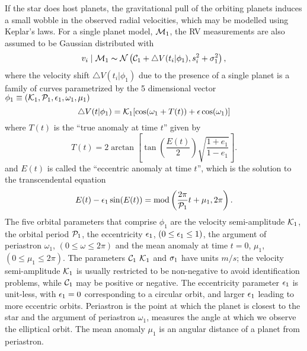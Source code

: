 If the star  does host planets, the gravitational pull of the orbiting
planets induces a small wobble in the observed radial velocities,
which may be modelled using Keplar's laws.
For a single planet model, $\M_1$, the RV measurements are also
assumed to be Gaussian distributed  with
\begin{equation}\label{Velocity_Model}
v_i \mid \M_1 \ind \N \left(\C_1 +\bigtriangleup
V(t_i|\phi_1),\s_i^2+\sj_1^2\right),
\end{equation}
where the velocity shift $\bigtriangleup
V(t_i|\phi_1)$ due to the presence of a single planet is
a  family of curves parametrized by the 5 dimensional vector
$\phi_1 \equiv (\K_1,\P_1,\e_1,\omega_1,\mu_1)$
\begin{equation}\label{Velocity_1p_Model}
\bigtriangleup V(t|\phi_1)=\K_1[\cos(\omega_1+T(t))+\e \cos(\omega_1)]
\end{equation}
where $T(t)$ is the ``true anomaly at time $t$'' given by
\begin{equation}\label{true_anomaly}
T(t)=2\arctan\left[\tan(\frac{E(t)}{2})\sqrt{\frac{1+e_1}{1-e_1}}\right].
\end{equation}
and $E(t)$ is called the ``eccentric anomaly at time $t$'', which is the
solution to the transcendental equation
\begin{equation}\label{transcendental_equation}
E(t)-\e_1\sin(E(t))=\mbox{mod}\left(\frac{2\pi}{\P_1}t+\mu_1,2\pi\right).
\end{equation}
The five orbital parameters that comprise $\phi_1$ are the velocity
semi-amplitude $\K_1$, the orbital period $\P_1$, the eccentricity $\e_1$,
$(0\leq \e_1 \le 1)$, the argument of periastron $\omega_1$, $(0\le \omega
\le 2\pi)$ and the mean anomaly at time $t=0$, $\mu_1$, $(0\le \mu_1
\le 2\pi)$.  The parameters $\C_1$ $\K_1$ and $\sj_1$ have units $m/s$;
the velocity semi-amplitude $\K_1$ is usually restricted to be
non-negative to avoid identification problems, while $\C_1$ may be
positive or negative.  The eccentricity parameter $\e_1$ is unit-less,
with $\e_1 = 0$ corresponding to a circular orbit, and larger $\e_1$ leading
to more eccentric orbits. Periastron is the point at which the planet
is closest to the star and the argument of periastron $\omega_1$, measures
the angle at which we observe the elliptical orbit.  The mean anomaly $\mu_1$ is
an angular distance of a planet from periastron. 

